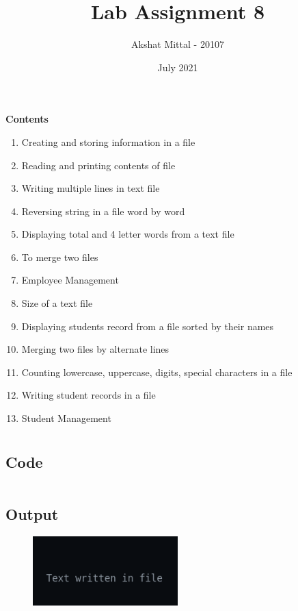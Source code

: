 \documentclass[12pt]{article}
\title{Lab Assignment 8}
\author{Akshat Mittal - 20107}
\date{July 2021}
\begin{document}
\maketitle
\vspace{7mm}
\textbf{Contents}
\vspace{7mm}
\begin{enumerate}
    \item Creating and storing information in a file
    \item Reading and printing contents of file
    \item Writing multiple lines in text file
    \item Reversing string in a file word by word
    \item Displaying total and 4 letter words from a text file
    \item To merge two files
    \item Employee Management
    \item Size of a text file
    \item Displaying students record from a file sorted by their names
    \item Merging two files by alternate lines
    \item Counting lowercase, uppercase, digits, special characters in a file
    \item Writing student records in a file
    \item Student Management
\end{enumerate}

\newpage
\section{}
\subsection{Code}
\inputminted{c}{q1.c}
\subsection{Output}
\begin{figure}[h]
    \centering
    \includegraphics[width=0.5\textwidth]{1.png}
\end{figure}
\end{document}
